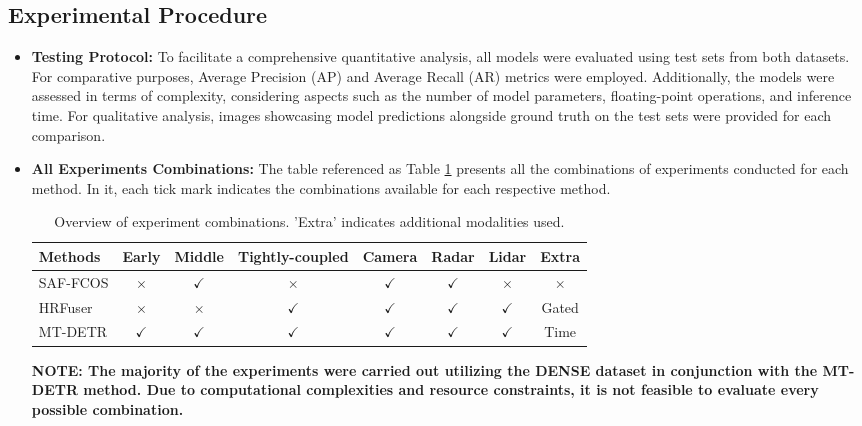 \documentclass[report.tex]{subfiles}
\begin{document}
        

        
        \subsection{Experimental Procedure}
        \begin{itemize}
            \item \textbf{Testing Protocol:} To facilitate a comprehensive quantitative analysis, all models were evaluated using test sets from both datasets. For comparative purposes, Average Precision (AP) and Average Recall (AR) metrics were employed. Additionally, the models were assessed in terms of complexity, considering aspects such as the number of model parameters, floating-point operations, and inference time. For qualitative analysis, images showcasing model predictions alongside ground truth on the test sets were provided for each comparison.
            \item \textbf{All Experiments Combinations:} The table referenced as Table \ref{tab:experiment_combinations} presents all the combinations of experiments conducted for each method. In it, each tick mark indicates the combinations available for each respective method. 

            \begin{table}[h!]
                \centering
                \caption{Overview of experiment combinations. 'Extra' indicates additional modalities used.}
                \begin{tabular}{|l|c|c|c|c|c|c|c|}
                \hline
                \textbf{Methods} & \textbf{Early} & \textbf{Middle} & \textbf{Tightly-coupled} & \textbf{Camera} & \textbf{Radar} & \textbf{Lidar} & \textbf{Extra} \\ \hline
                SAF-FCOS & $\times$ & $\checkmark$ & $\times$ & $\checkmark$ & $\checkmark$ & $\times$ & $\times$ \\ \hline
                HRFuser & $\times$ & $\times$ & $\checkmark$ & $\checkmark$ & $\checkmark$ & $\checkmark$ & Gated \\ \hline
                MT-DETR & $\checkmark$ & $\checkmark$ & $\checkmark$ & $\checkmark$ & $\checkmark$ & $\checkmark$ & Time \\ \hline
                \end{tabular}
                \label{tab:experiment_combinations}
                \end{table}

            
            \textbf{NOTE: The majority of the experiments were carried out utilizing the DENSE dataset in conjunction with the MT-DETR method. Due to computational complexities and resource constraints, it is not feasible to evaluate every possible combination.}
                
        \end{itemize}
        
\end{document}
